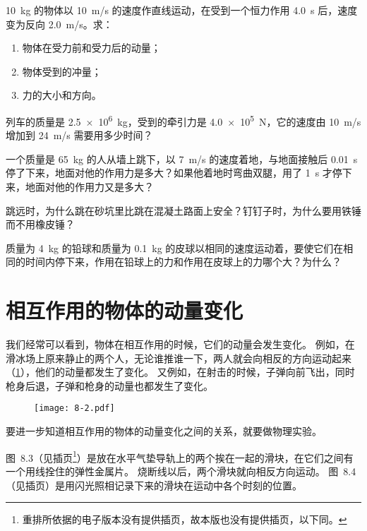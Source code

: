 \begin{Practice}
\begin{question}
  \item \qty{10}{kg} 的物体以 \qty{10}{m/s} 的速度作直线运动，在受到一个恒力作用 \qty{4.0}{s} 后，速度变为反向 \qty{2.0}{m/s}。求：
  \begin{enumerate}
    \item 物体在受力前和受力后的动量；
    \item 物体受到的冲量；
    \item 力的大小和方向。
  \end{enumerate}
  \item 列车的质量是 \qty{2.5e6}{kg}，受到的牵引力是 \qty{4.0e5}{N}，它的速度由 \qty{10}{m/s} 增加到 \qty{24}{m/s} 需要用多少时间？
  \item 一个质量是 \qty{65}{kg} 的人从墙上跳下，以 \qty{7}{m/s} 的速度着地，与地面接触后 \qty{0.01}{s} 停了下来，地面对他的作用力是多大？如果他着地时弯曲双腿，用了 \qty{1}{s} 才停下来，地面对他的作用力又是多大？
  \item 跳远时，为什么跳在砂坑里比跳在混凝土路面上安全？钉钉子时，为什么要用铁锤而不用橡皮锤？
  \item 质量为 \qty{4}{kg} 的铅球和质量为 \qty{0.1}{kg} 的皮球以相同的速度运动着，要使它们在相同的时间内停下来，作用在铅球上的力和作用在皮球上的力哪个大？为什么？
\end{question}
\end{Practice}

\section{相互作用的物体的动量变化}\label{sec:momentum_change}
我们经常可以看到，物体在相互作用的时候，它们的动量会发生变化。
例如，在滑冰场上原来静止的两个人，无论谁推谁一下，两人就会向相反的方向运动起来（\cref{fig:8-2}），他们的动量都发生了变化。
又例如，在射击的时候，子弹向前飞出，同时枪身后退，子弹和枪身的动量也都发生了变化。
\begin{figure}
  \texttt{[image: 8-2.pdf]}
  \caption{}\label{fig:8-2}
\end{figure}

要进一步知道相互作用的物体的动量变化之间的关系，就要做物理实验。

图~8.3（见插页\footnote{重排所依据的电子版本没有提供插页，故本版也没有提供插页，以下同。}）是放在水平气垫导轨上的两个挨在一起的滑块，在它们之间有一个用线拴住的弹性金属片。
烧断线以后，两个滑块就向相反方向运动。
图~8.4（见插页）是用闪光照相记录下来的滑块在运动中各个时刻的位置。


